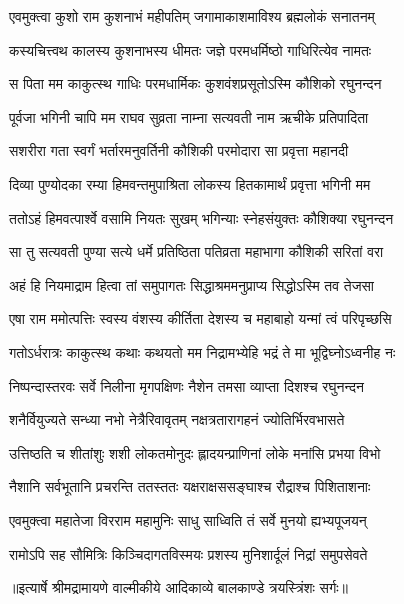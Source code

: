 \twolineshloka
{एवमुक्त्वा कुशो राम कुशनाभं महीपतिम्}
{जगामाकाशमाविश्य ब्रह्मलोकं सनातनम्} %

\twolineshloka
{कस्यचित्त्वथ कालस्य कुशनाभस्य धीमतः}
{जज्ञे परमधर्मिष्ठो गाधिरित्येव नामतः} %

\twolineshloka
{स पिता मम काकुत्स्थ गाधिः परमधार्मिकः}
{कुशवंशप्रसूतोऽस्मि कौशिको रघुनन्दन} %

\twolineshloka
{पूर्वजा भगिनी चापि मम राघव सुव्रता}
{नाम्ना सत्यवती नाम ऋचीके प्रतिपादिता} %

\twolineshloka
{सशरीरा गता स्वर्गं भर्तारमनुवर्तिनी}
{कौशिकी परमोदारा सा प्रवृत्ता महानदी} %

\twolineshloka
{दिव्या पुण्योदका रम्या हिमवन्तमुपाश्रिता}
{लोकस्य हितकामार्थं प्रवृत्ता भगिनी मम} %

\twolineshloka
{ततोऽहं हिमवत्पार्श्वे वसामि नियतः सुखम्}
{भगिन्याः स्नेहसंयुक्तः कौशिक्या रघुनन्दन} %

\twolineshloka
{सा तु सत्यवती पुण्या सत्ये धर्मे प्रतिष्ठिता}
{पतिव्रता महाभागा कौशिकी सरितां वरा} %

\twolineshloka
{अहं हि नियमाद्राम हित्वा तां समुपागतः}
{सिद्धाश्रममनुप्राप्य सिद्धोऽस्मि तव तेजसा} %

\twolineshloka
{एषा राम ममोत्पत्तिः स्वस्य वंशस्य कीर्तिता}
{देशस्य च महाबाहो यन्मां त्वं परिपृच्छसि} %

\twolineshloka
{गतोऽर्धरात्रः काकुत्स्थ कथाः कथयतो मम}
{निद्रामभ्येहि भद्रं ते मा भूद्विघ्नोऽध्वनीह नः} %

\twolineshloka
{निष्पन्दास्तरवः सर्वे निलीना मृगपक्षिणः}
{नैशेन तमसा व्याप्ता दिशश्च रघुनन्दन} %

\twolineshloka
{शनैर्वियुज्यते सन्ध्या नभो नेत्रैरिवावृतम्}
{नक्षत्रतारागहनं ज्योतिर्भिरवभासते} %

\twolineshloka
{उत्तिष्ठति च शीतांशुः शशी लोकतमोनुदः}
{ह्लादयन्प्राणिनां लोके मनांसि प्रभया विभो} %

\twolineshloka
{नैशानि सर्वभूतानि प्रचरन्ति ततस्ततः}
{यक्षराक्षससङ्घाश्च रौद्राश्च पिशिताशनाः} %

\twolineshloka
{एवमुक्त्वा महातेजा विरराम महामुनिः}
{साधु साध्विति तं सर्वे मुनयो ह्यभ्यपूजयन्} %

\twolineshloka
{रामोऽपि सह सौमित्रिः किञ्चिदागतविस्मयः}
{प्रशस्य मुनिशार्दूलं निद्रां समुपसेवते} %


{॥इत्यार्षे श्रीमद्रामायणे वाल्मीकीये आदिकाव्ये बालकाण्डे त्रयस्त्रिंशः सर्गः॥}

